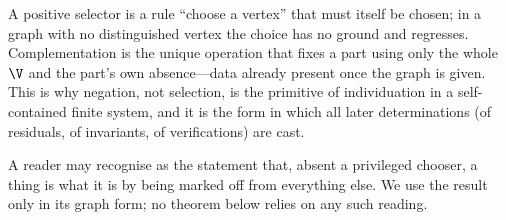 \begin{remark}
\label{rem:regress}
A positive selector is a rule ``choose a vertex'' that must itself be chosen; in
a graph with no distinguished vertex the choice has no ground and regresses.
Complementation is the unique operation that fixes a part using only the whole
$\V$ and the part's own absence---data already present once the graph is given.
This is why negation, not selection, is the primitive of individuation in a
self-contained finite system, and it is the form in which all later
determinations (of residuals, of invariants, of verifications) are cast.
\end{remark}

\begin{remark}
\label{rem:negation-interp}
A reader may recognise  as the statement that, absent a
privileged chooser, a thing is what it is by being marked off from everything
else. We use the result only in its graph form; no theorem below relies on any
such reading.
\end{remark}
